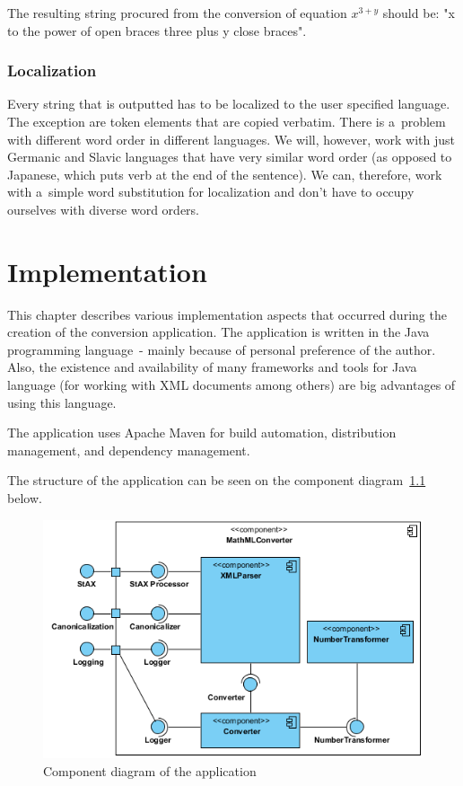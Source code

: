 \documentclass[11pt,oneside,final]{fithesis2}
\def\s#1{#1\index{#1}}
\begin{document}
The resulting string procured from the conversion of equation $x^{3+y}$ should be: "x to the power of open braces three plus y close braces".

\subsection{Localization}
Every string  that is outputted has to be localized to the user specified language. The exception are token elements that are copied verbatim. There is a~problem with different word order in different languages. We will, however, work with just Germanic and Slavic languages that have very similar word order (as opposed to Japanese, which puts verb at the end of the sentence). We can, therefore, work with a~simple word substitution for localization and don't have to occupy ourselves with diverse word orders.

\chapter{Implementation}
\label{chapter:implementation}
This chapter describes various implementation aspects that occurred during the creation of the conversion application. The application is written in the \s{Java} programming language~- mainly because of personal preference of the author. Also, the existence and availability of many frameworks and tools for Java language (for working with XML documents among others) are big advantages of using this language. 

The application uses Apache Maven for build automation, distribution management, and dependency management.

The structure of the application can be seen on the component diagram~\ref{fig:componentdiagram} below.

\begin{figure}[!ht]
\centering
\includegraphics[width=\textwidth]{component_diagram}
\caption{Component diagram of the application}
\label{fig:componentdiagram}
\end{figure}
\end{document}
